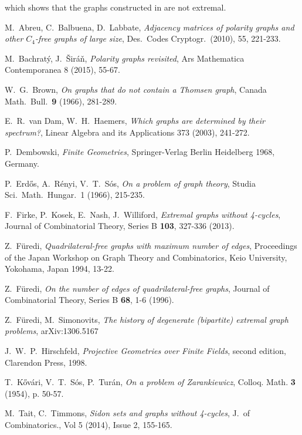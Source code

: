 \documentclass[12pt]{article}
\begin{document}
\noindent which shows that the graphs constructed in \cite{tt} are not extremal.


\begin{thebibliography}{10}

    M.\ Abreu, C.\ Balbuena, D.\ Labbate,
    {\em Adjacency matrices of polarity graphs and other $C_4$-free graphs of large size},
    Des.\ Codes Cryptogr.\ (2010), 55, 221-233.

    M.\ Bachrat\'{y}, J.\ \v{S}ir\'{a}\v{n},
    {\em Polarity graphs revisited},
    Ars Mathematica Contemporanea 8 (2015), 55-67.

    W.\ G.\ Brown,
    {\em On graphs that do not contain a Thomsen graph},
    Canada Math.\ Bull.\ {\bf 9} (1966), 281-289.

    E.\ R.\ van Dam, W.\ H.\ Haemers,
    {\em Which graphs are determined by their spectrum?},
    Linear Algebra and its Applications 373 (2003), 241-272.

    P.\ Dembowski,
    {\em Finite Geometries},
    Springer-Verlag Berlin Heidelberg 1968, Germany.

    P.\ Erd\H{o}s, A.\ R\'{e}nyi, V.\ T.\ S\'{o}s,
    {\em On a problem of graph theory},
    Studia Sci.\ Math.\ Hungar.\ 1 (1966), 215-235.

    F.\ Firke, P.\ Kosek, E.\ Nash, J.\ Williford,
    {\em Extremal graphs without 4-cycles}, Journal of Combinatorial Theory, Series B {\bf 103}, 327-336 (2013).

    Z.\ F\"{u}redi,
    {\em Quadrilateral-free graphs with maximum number of edges},
    Proceedings of the Japan Workshop on Graph Theory and Combinatorics,
    Keio University, Yokohama, Japan 1994, 13-22.

    Z.\ F\"{u}redi,
    {\em On the number of edges of quadrilateral-free graphs},
    Journal of Combinatorial Theory, Series B {\bf 68}, 1-6 (1996).

    Z.\ F\"{u}redi, M.\ Simonovits,
    {\em The history of degenerate (bipartite) extremal graph problems},
    arXiv:1306.5167

    J.\ W.\ P.\ Hirschfeld,
    {\em Projective Geometries over Finite Fields}, second edition,
    Clarendon Press, 1998.

    T.\ K\H{o}v\'{a}ri, V.\ T.\ S\'{o}s, P.\ Tur\'{a}n,
    {\em On a problem of Zarankiewicz},
    Colloq. Math. {\bf 3} (1954), p. 50-57.

    M.\ Tait, C.\ Timmons,
    {\em Sidon sets and graphs without 4-cycles},
    J.\ of Combinatorics., Vol 5 (2014), Issue 2, 155-165.



\end{thebibliography}
\end{document}
